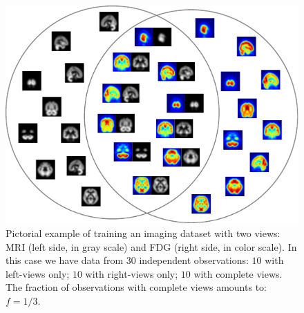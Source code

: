 \begin{figure}[!h]
\centering
\includegraphics[width=0.8\columnwidth]{./tex/fig/nimg_scheme.pdf}
\caption{
	Pictorial example of training an imaging dataset with two views: MRI (left side, in gray scale) and FDG (right side, in color scale).
	In this case we have data from 30 independent observations:
	$10$ with left-views only; $10$ with right-views only; $10$ with complete views.
	The fraction of observations with complete views amounts to: $f = 1/3$.
}
\label{fig:nimg_scheme}
\end{figure}
%
